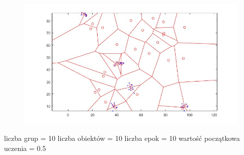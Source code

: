 \documentclass[11pt]{article}
\begin{document}
\begin{figure}[h!]
  \includegraphics{screeny/CWTA/CWTA_5_groups/CWTA_Areas.jpg}
\end{figure}

liczba grup = 10 liczba obiektów = 10 liczba epok = 10 wartość
początkowa uczenia = 0.5
\end{document}
